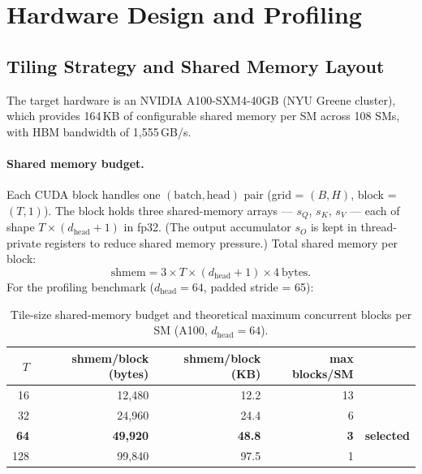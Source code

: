 
\section{Hardware Design and Profiling}
\label{sec:profiling}

\subsection{Tiling Strategy and Shared Memory Layout}
\label{sec:tiling}

The target hardware is an NVIDIA A100-SXM4-40GB (NYU Greene cluster),
which provides 164\,KB of configurable shared memory per SM across 108 SMs,
with HBM bandwidth of 1{,}555\,GB/s.

\paragraph{Shared memory budget.}
Each CUDA block handles one $(\text{batch}, \text{head})$ pair
(grid = $(B, H)$, block = $(T, 1)$).
The block holds three shared-memory arrays --- $s_Q$, $s_K$, $s_V$ ---
each of shape $T \times (d_{\text{head}} + 1)$ in fp32.
(The output accumulator $s_O$ is kept in thread-private registers to reduce
shared memory pressure.)
Total shared memory per block:
\begin{equation}
  \text{shmem} = 3 \times T \times (d_{\text{head}} + 1) \times 4~\text{bytes.}
\end{equation}
For the profiling benchmark ($d_{\text{head}} = 64$, padded stride = 65):

\begin{table}[h]
\centering
\caption{Tile-size shared-memory budget and theoretical maximum concurrent blocks per SM (A100, $d_{\text{head}}=64$).}
\label{tab:shmem_budget}
\begin{tabular}{rrrrc}
\hline
$T$ & shmem/block (bytes) & shmem/block (KB) & max blocks/SM & \\
\hline
 16 & 12,480 & 12.2 & 13 & \\
 32 & 24,960 & 24.4 &  6 & \\
 \textbf{64} & \textbf{49,920} & \textbf{48.8} & \textbf{3} & \textbf{selected} \\
128 & 99,840 & 97.5 &  1 & \\
\hline
\end{tabular}
\end{table}

